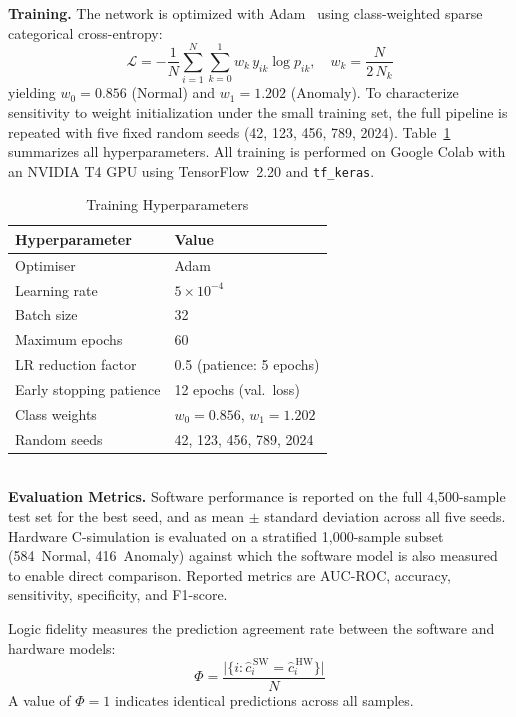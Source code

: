 \documentclass[12pt, letterpaper]{article}
\begin{document}
\noindent\textbf{Training.}\quad
The network is optimized with Adam~\cite{Kingma2015} using class-weighted
sparse categorical cross-entropy:
\begin{equation}
  \mathcal{L} = -\frac{1}{N}\sum_{i=1}^{N}\sum_{k=0}^{1}
  w_k\,y_{ik}\log p_{ik}, \quad w_k = \frac{N}{2\,N_k}
  \label{eq:loss}
\end{equation}
yielding $w_0{=}0.856$ (Normal) and $w_1{=}1.202$ (Anomaly).
To characterize sensitivity to weight initialization under the small
training set, the full pipeline is repeated with five fixed random seeds
(42, 123, 456, 789, 2024).
Table~\ref{tab:train} summarizes all
hyperparameters.  All training is performed on Google Colab with an
NVIDIA T4 GPU using TensorFlow~2.20 and \texttt{tf\_keras}.
\begin{table}[!ht]
  \centering
  \caption{Training Hyperparameters}
  \label{tab:train}
  \begin{tabular}{ll}
    \toprule
    \textbf{Hyperparameter} & \textbf{Value} \\
    \midrule
    Optimiser               & Adam \\
    Learning rate           & $5 \times 10^{-4}$ \\
    Batch size              & 32 \\
    Maximum epochs         
 & 60 \\
    LR reduction factor     & 0.5 (patience: 5 epochs) \\
    Early stopping patience & 12 epochs (val.\ loss) \\
    Class weights           & $w_0{=}0.856$,\;
$w_1{=}1.202$ \\
    Random seeds            & 42, 123, 456, 789, 2024 \\
    \bottomrule
  \end{tabular}
\end{table} \\

\noindent\textbf{Evaluation Metrics.}\quad
Software performance is reported on the full 4{,}500-sample test set for
the best seed, and as mean $\pm$ standard deviation across all five
seeds.
Hardware C-simulation is evaluated on a stratified
1{,}000-sample subset (584~Normal, 416~Anomaly) against which the
software model is also measured to enable direct comparison.
Reported metrics are AUC-ROC, accuracy, sensitivity, specificity, and F1-score.

Logic fidelity measures the prediction agreement rate between the
software and hardware models:
\begin{equation}
  \Phi = \frac{\bigl|\{i : \hat{c}_i^{\,\mathrm{SW}}
  = \hat{c}_i^{\,\mathrm{HW}}\}\bigr|}{N}
  \label{eq:fidelity}
\end{equation}
A value of $\Phi = 1$ indicates identical predictions across all samples.
\end{document}

